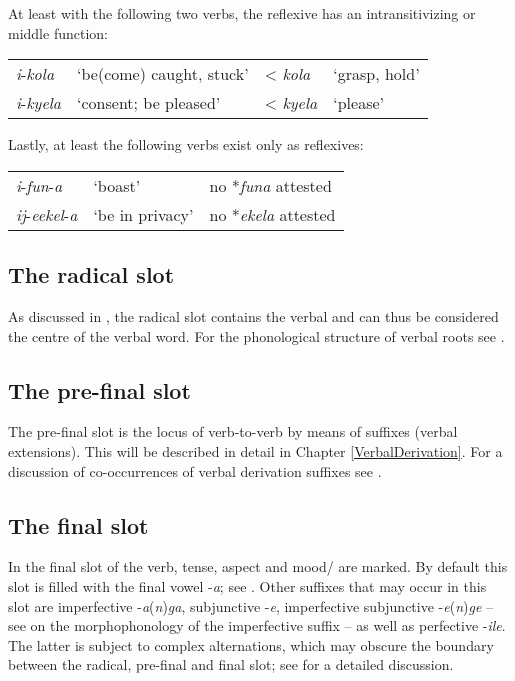 At least with the following two verbs, the reflexive has an intransitivizing or middle function:
\begin{exe}
	\ex
	\begin{tabular}[t]{llll}
		\textit{i}-\textit{kola} & \lq be(come) caught, stuck' & < \textit{kola} & \lq grasp, hold'\\
		\textit{i}-\textit{kyela} & \lq consent; be pleased' & < \textit{kyela} & \lq please'
	\end{tabular}
\end{exe}

Lastly, at least the following verbs exist only as reflexives:
\begin{exe}
	\ex
	\begin{tabular}[t]{lll}
		\textit{i}-\textit{fun}-\textit{a} & \lq boast'& no *\textit{funa} attested\\
		\textit{ij}-\textit{eekel}-\textit{a} & \lq be in privacy' & no *\textit{ekela} attested
	\end{tabular}
\end{exe}
 

\subsection{The radical slot}
As discussed in , the radical slot contains the verbal  and can thus be considered the centre of the verbal word. For the phonological structure of verbal roots see .

\subsection{The pre-final slot}
The pre-final slot is the locus of verb-to-verb  by means of suffixes (verbal extensions). This will be described in detail in Chapter \ref{VerbalDerivation}. For a discussion of co-occurrences of verbal derivation suffixes see .

\subsection{The final slot}\label{FinalSlot}
In the final slot of the verb, tense, aspect and  {mood}/ are marked. By default this slot is filled with the final vowel -\textit{a}; see . Other suffixes that may occur in this slot are imperfective -\textit{a}(\textit{n})\textit{ga}, subjunctive -\textit{e}, imperfective subjunctive -\textit{e}(\textit{n})\textit{ge} -- see  on the morphophonology of the imperfective suffix -- as well as perfective -\textit{ile}. The latter is subject to complex alternations, which may obscure the boundary between the radical, pre-final and final slot; see  for a detailed discussion.


